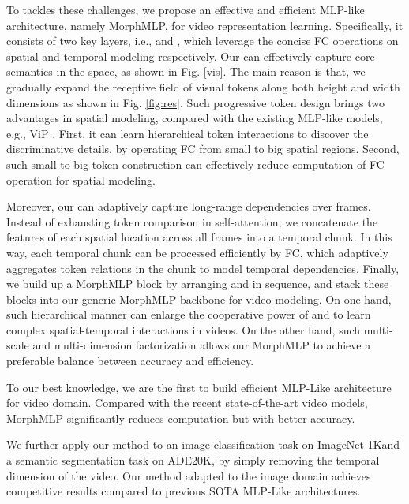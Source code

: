 \documentclass[runningheads]{llncs}
\begin{document}
To tackles these challenges,
we propose an effective and efficient MLP-like architecture,
namely MorphMLP,
for video representation learning.
Specifically,
it consists of two key layers,
i.e.,
 and , 
which leverage the concise FC operations on spatial and temporal modeling respectively. Our  can effectively capture core semantics in the space,
as shown in Fig. \ref{vis}.
The main reason is that,
we gradually expand the receptive field of visual tokens along both height and width dimensions as shown in Fig. \ref{fig:res}.
Such progressive token design brings two advantages in spatial modeling,
compared with the existing MLP-like models, e.g., ViP \cite{vip}.
First,
it can learn hierarchical token interactions to discover the discriminative details,
by operating FC from small to big spatial regions.
Second,
such small-to-big token construction can effectively reduce computation of FC operation for spatial modeling.

 








Moreover,
our  can adaptively capture long-range dependencies over frames.
Instead of exhausting token comparison in self-attention,
we concatenate the features of each spatial location across all frames into a temporal chunk. 
In this way, 
each temporal chunk can be processed efficiently by FC,
which adaptively aggregates token relations in the chunk to model temporal dependencies.
Finally,
we build up a MorphMLP block by arranging  and  in sequence,
and stack these blocks into our generic MorphMLP backbone for video modeling.
On one hand,
such hierarchical manner can enlarge the cooperative power of  and  to learn complex spatial-temporal interactions in videos.
On the other hand,
such multi-scale and multi-dimension factorization allows our MorphMLP to achieve a preferable balance between accuracy and efficiency.
 
To our best knowledge, 
we are the first to build efficient MLP-Like architecture for video domain.
Compared with the recent state-of-the-art video models,
MorphMLP significantly reduces computation but with better accuracy.


We further apply our method to an image classification task on ImageNet-1K\cite{imagenet}and a semantic segmentation task on ADE20K\cite{ade20k}, by simply removing the temporal dimension of the video. Our method adapted to the image domain achieves competitive results compared to previous SOTA MLP-Like architectures. 
\end{document}
